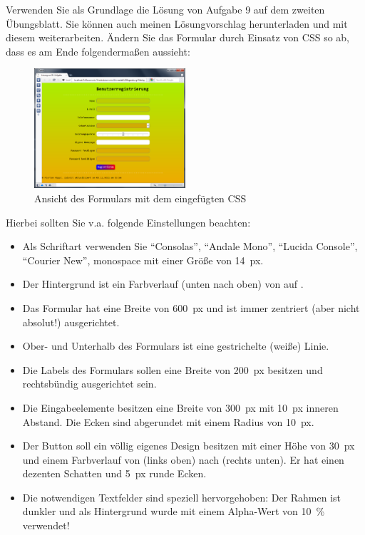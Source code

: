 %
\par Verwenden Sie als Grundlage die Lösung von Aufgabe 9 auf dem zweiten
Übungsblatt. Sie können auch meinen Lösungvorschlag herunterladen und mit
diesem weiterarbeiten. Ändern Sie das Formular durch Einsatz von CSS so ab,
dass es am Ende folgendermaßen aussieht:
%
\begin{figure}[!h]
\centering
\includegraphics[width=0.5\textwidth]{Exercises/Figures/form.png}
\caption{Ansicht des Formulars mit dem eingefügten CSS}
\label{fig:form}
\end{figure}
%
\par Hierbei sollten Sie v.a. folgende Einstellungen beachten:
%
\begin{itemize}
\item
Als Schriftart verwenden Sie ``Consolas'', ``Andale Mono'', ``Lucida Console'',
``Courier New'', monospace mit einer Größe von \qty{14}{px}.
\item
Der Hintergrund ist ein Farbverlauf (unten nach oben) von  auf
.
\item
Das Formular hat eine Breite von \qty{600}{px} und ist immer zentriert (aber
nicht absolut!) ausgerichtet.
\item
Ober- und Unterhalb des Formulars ist eine gestrichelte (weiße) Linie.
\item
Die Labels des Formulars sollen eine Breite von \qty{200}{px} besitzen und
rechtsbündig ausgerichtet sein.
\item
Die Eingabeelemente besitzen eine Breite von \qty{300}{px} mit \qty{10}{px}
inneren Abstand. Die Ecken sind abgerundet mit einem Radius von \qty{10}{px}.
\item
Der Button soll ein völlig eigenes Design besitzen mit einer Höhe von
\qty{30}{px} und einem Farbverlauf von  (links oben) nach
 (rechts unten). Er hat einen dezenten Schatten und \qty{5}{px}
runde Ecken.
\item
Die notwendigen Textfelder sind speziell hervorgehoben: Der Rahmen ist dunkler
und als Hintergrund wurde  mit einem Alpha-Wert von
\qty{10}{\%} verwendet!
\end{itemize}